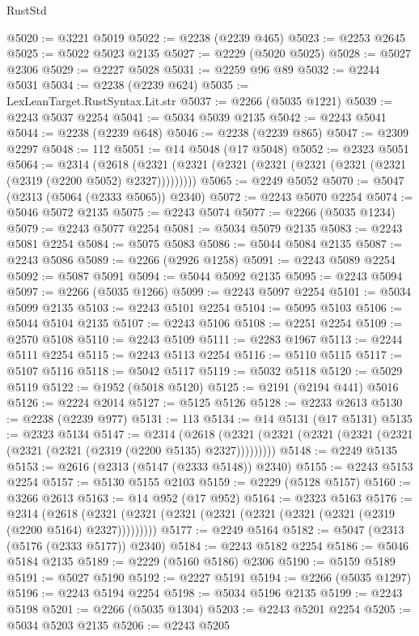 \begin{lexlean}{RustStd}
\begin{coremodule}
@5020 := @3221 @5019
@5022 := @2238 (@2239 @465)
@5023 := @2253 @2645
@5025 := @5022 @5023 @2135
@5027 := @2229 (@5020 @5025)
@5028 := @5027 @2306
@5029 := @2227 @5028
@5031 := @2259 @96 @89
@5032 := @2244 @5031
@5034 := @2238 (@2239 @624)
@5035 := LexLeanTarget.RustSyntax.Lit.str
@5037 := @2266 (@5035 @1221)
@5039 := @2243 @5037 @2254
@5041 := @5034 @5039 @2135
@5042 := @2243 @5041
@5044 := @2238 (@2239 @648)
@5046 := @2238 (@2239 @865)
@5047 := @2309 @2297
@5048 := 112
@5051 := @14 @5048 (@17 @5048)
@5052 := @2323 @5051
@5064 := @2314
    (@2618 (@2321 (@2321 (@2321 (@2321 (@2321 (@2321 (@2321 (@2319 (@2200 @5052) @2327)))))))))
@5065 := @2249 @5052
@5070 := @5047 (@2313 (@5064 (@2333 @5065)) @2340)
@5072 := @2243 @5070 @2254
@5074 := @5046 @5072 @2135
@5075 := @2243 @5074
@5077 := @2266 (@5035 @1234)
@5079 := @2243 @5077 @2254
@5081 := @5034 @5079 @2135
@5083 := @2243 @5081 @2254
@5084 := @5075 @5083
@5086 := @5044 @5084 @2135
@5087 := @2243 @5086
@5089 := @2266 (@2926 @1258)
@5091 := @2243 @5089 @2254
@5092 := @5087 @5091
@5094 := @5044 @5092 @2135
@5095 := @2243 @5094
@5097 := @2266 (@5035 @1266)
@5099 := @2243 @5097 @2254
@5101 := @5034 @5099 @2135
@5103 := @2243 @5101 @2254
@5104 := @5095 @5103
@5106 := @5044 @5104 @2135
@5107 := @2243 @5106
@5108 := @2251 @2254
@5109 := @2570 @5108
@5110 := @2243 @5109
@5111 := @2283 @1967
@5113 := @2244 @5111 @2254
@5115 := @2243 @5113 @2254
@5116 := @5110 @5115
@5117 := @5107 @5116
@5118 := @5042 @5117
@5119 := @5032 @5118
@5120 := @5029 @5119
@5122 := @1952 (@5018 @5120)
@5125 := @2191 (@2194 @441) @5016
@5126 := @2224 @2014
@5127 := @5125 @5126
@5128 := @2233 @2613
@5130 := @2238 (@2239 @977)
@5131 := 113
@5134 := @14 @5131 (@17 @5131)
@5135 := @2323 @5134
@5147 := @2314
    (@2618 (@2321 (@2321 (@2321 (@2321 (@2321 (@2321 (@2321 (@2319 (@2200 @5135) @2327)))))))))
@5148 := @2249 @5135
@5153 := @2616 (@2313 (@5147 (@2333 @5148)) @2340)
@5155 := @2243 @5153 @2254
@5157 := @5130 @5155 @2103
@5159 := @2229 (@5128 @5157)
@5160 := @3266 @2613
@5163 := @14 @952 (@17 @952)
@5164 := @2323 @5163
@5176 := @2314
    (@2618 (@2321 (@2321 (@2321 (@2321 (@2321 (@2321 (@2321 (@2319 (@2200 @5164) @2327)))))))))
@5177 := @2249 @5164
@5182 := @5047 (@2313 (@5176 (@2333 @5177)) @2340)
@5184 := @2243 @5182 @2254
@5186 := @5046 @5184 @2135
@5189 := @2229 (@5160 @5186) @2306
@5190 := @5159 @5189
@5191 := @5027 @5190
@5192 := @2227 @5191
@5194 := @2266 (@5035 @1297)
@5196 := @2243 @5194 @2254
@5198 := @5034 @5196 @2135
@5199 := @2243 @5198
@5201 := @2266 (@5035 @1304)
@5203 := @2243 @5201 @2254
@5205 := @5034 @5203 @2135
@5206 := @2243 @5205

\end{coremodule}
\end{lexlean}
